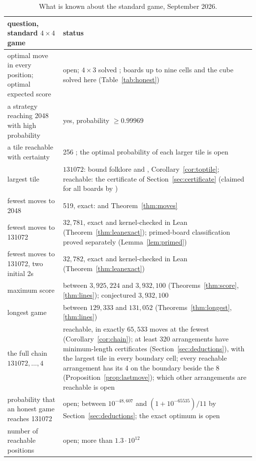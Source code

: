 \documentclass[11pt]{article}
\theoremstyle{definition}
\theoremstyle{remark}
\begin{document}
\begin{table}[t]
\centering\footnotesize
\begin{tabular}{@{}p{}p{}@{}}
\toprule
question, standard $4\times4$ game & status \\
\midrule
optimal move in every position; optimal expected score & open; $4\times3$ solved \cite{kaneko2026}; boards up to nine cells and the cube solved here (Table~\ref{tab:honest}) \\
a strategy reaching 2048 with high probability & yes, probability $\ge0.99969$ \cite{slizkov2023} \\
a tile reachable with certainty & 256 \cite{slizkov2023}; the optimal probability of each larger tile is open \\
largest tile & $131072$: bound folklore and \cite{daspaul2018}, Corollary~\ref{cor:toptile}; reachable: the certificate of Section~\ref{sec:certificate} (claimed for all boards by \cite{daspaul2018}) \\
fewest moves to 2048 & 519, exact: \cite{leesmiller2017} and Theorem~\ref{thm:moves} \\
fewest moves to 131072 & $32{,}781$, exact and kernel-checked in Lean (Theorem~\ref{thm:leanexact}); primed-board classification proved separately (Lemma~\ref{lem:primed}) \\
fewest moves to 131072, two initial 2s & $32{,}782$, exact and kernel-checked in Lean (Theorem~\ref{thm:leanexact}) \\
maximum score & between $3{,}925{,}224$ and $3{,}932{,}100$ (Theorems~\ref{thm:score}, \ref{thm:lines}); conjectured $3{,}932{,}100$ \\
longest game & between $129{,}333$ and $131{,}052$ (Theorems~\ref{thm:longest}, \ref{thm:lines}) \\
the full chain $131072,\dots,4$ & reachable, in exactly $65{,}533$ moves at the fewest (Corollary~\ref{cor:chain}); at least 320 arrangements have minimum-length certificates (Section~\ref{sec:deductions}), with the largest tile in every boundary cell; every reachable arrangement has its 4 on the boundary beside the 8 (Proposition~\ref{prop:lastmove}); which other arrangements are reachable is open \\
probability that an honest game reaches 131072 & open; between $10^{-48{,}607}$ and $(1+10^{-65535})/11$ by Section~\ref{sec:deductions}; the exact optimum is open \\
number of reachable positions & open; more than $1.3\cdot10^{12}$ \cite{leesmiller2017b} \\
\bottomrule
\end{tabular}
\caption{What is known about the standard game, September 2026.}
\label{tab:status}
\end{table}
\end{document}
